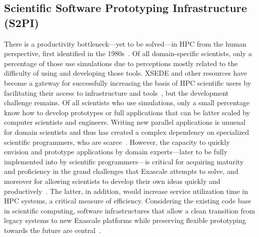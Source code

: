 \documentclass[11pt, oneside]{amsart}
\begin{document}
\subsection{Scientific Software Prototyping Infrastructure (S2PI)}
\label{sec:prototyping}

There is a productivity bottleneck---yet to be solved---in HPC from the human
perspective, first identified in the 1980s~\cite{barstow1982automatic}. Of all
domain-specific scientists, only a percentage of those use simulations due to
perceptions mostly related to the difficulty of using and developing those tools.
XSEDE and other resources have become a gateway for successfully increasing the
basis of HPC scientific users by facilitating their access to infrastructure and
tools~\cite{towns2014xsede}, but the development challenge remains.
Of all scientists who use simulations, only a small percentage know how
to develop prototypes or full applications that can be latter scaled by computer
scientists and engineers. Writing new parallel applications is unusual for
domain scientists and thus has created a complex dependency on specialized
scientific programmers, who are scarce~\cite{post2005computational}. However,
the capacity to quickly envision and prototype applications by domain
experts---later to be fully implemented into by scientific programmers---is critical for
acquiring maturity and proficiency in the grand challenges that Exascale
attempts to solve, and moreover for allowing scientists to develop their own
ideas quickly and productively~\cite{vinter2015prototyping}. The latter, in
addition, would increase service utilization time in HPC systems, a critical
measure of efficiency. Considering the existing code base in scientific
computing, software infrastructures that allow a clean transition from legacy
systems to new Exascale platforms while preserving flexible prototyping
towards the future are central~\cite{hwu2015transitioning}.
\end{document}
